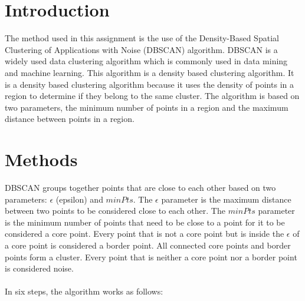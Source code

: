 \documentclass[twoside, a4paper, fleqn, reqno]{article}
\begin{document}
\maketitle

\section{Introduction}

The method used in this assignment is the use of the Density-Based Spatial Clustering of Applications with Noise (DBSCAN) algorithm. 
DBSCAN is a widely used data clustering algorithm
which is commonly used in data mining and machine learning.
This algorithm is a density based clustering algorithm. 
It is a density based clustering algorithm because it uses the density of points in a region to determine if they belong to the same cluster. 
The algorithm is based on two parameters, the minimum number of points in a region and the maximum distance between points in a region. 

\section{Methods}

DBSCAN groups together points that are close to each other based on two parameters: $\epsilon$ (epsilon) and $minPts$.
The $\epsilon$ parameter is the maximum distance between two points to be considered close to each other.
The $minPts$ parameter is the minimum number of points that need to be close to a point for it to be considered a core point.
Every point that is not a core point but is inside the $\epsilon$ of a core point is considered a border point.
All connected core points and border points form a cluster. Every point that is neither a core point nor a border point is considered noise.
\\\\In six steps, the algorithm works as follows:
\end{document}
